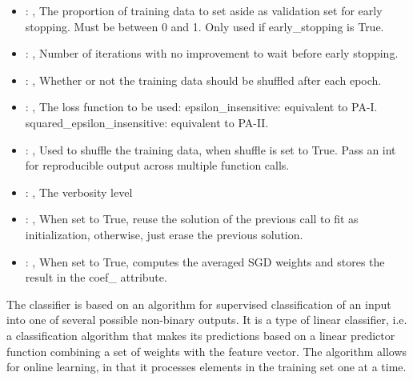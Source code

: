 \begin{itemize}
    \item {}: , 
      The proportion of training data to set aside as validation set for early stopping.
      Must be between 0 and 1. Only used if early\_stopping is True.

    \item {}: , 
      Number of iterations with no improvement to wait before early stopping.

    \item {}: , 
      Whether or not the training data should be shuffled after each epoch.

    \item {}: , 
      The loss function to be used: epsilon\_insensitive: equivalent to PA-I.
      squared\_epsilon\_insensitive: equivalent to PA-II.

    \item {}: , 
      Used to shuffle the training data, when shuffle is set to
      True. Pass an int for reproducible output across multiple function calls.

    \item {}: , 
      The verbosity level

    \item {}: , 
      When set to True, reuse the solution of the previous call
      to fit as initialization, otherwise, just erase the previous solution.

    \item {}: , 
      When set to True, computes the averaged SGD weights and
      stores the result in the coef\_ attribute.
  \end{itemize}
 The  classifier is based on an                         algorithm for supervised
 classification of                         an input into one of several possible non-binary outputs.
 It is a type of linear classifier, i.e. a classification algorithm that makes
 its predictions based on a linear predictor function combining a set of weights
 with the feature vector.                         The algorithm allows for online learning, in that
 it processes elements in the                         training set one at a time.

